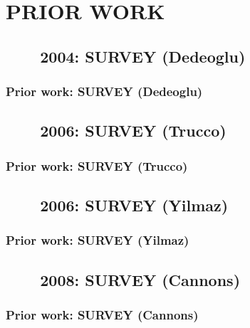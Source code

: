 \section{PRIOR WORK}
\subsection{\ \ \ \ 2004: SURVEY (Dedeoglu)}
\begin{frame}
\frametitle{Prior work: SURVEY (Dedeoglu)}
\framesubtitle{}
\mypagenum
{}
\end{frame}

\subsection{\ \ \ \ 2006: SURVEY (Trucco)}
\begin{frame}
\frametitle{Prior work: SURVEY (Trucco)}
\framesubtitle{}
\mypagenum
{}
\end{frame}



\subsection{\ \ \ \ 2006: SURVEY (Yilmaz)}
\begin{frame}
\frametitle{Prior work: SURVEY (Yilmaz)}
\framesubtitle{}
\mypagenum
{}
\end{frame}


\subsection{\ \ \ \ 2008: SURVEY (Cannons)}
\begin{frame}
\frametitle{Prior work: SURVEY (Cannons)}
\framesubtitle{}
\mypagenum
{}
\end{frame}




